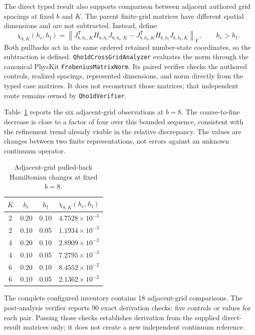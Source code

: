 \documentclass[11pt]{article}
\newcommand{\fro}{\mathrm{F}}
\newcommand{\code}[1]{\texttt{#1}}
\begin{document}
The direct typed result also supports comparison between adjacent authored grid
spacings at fixed $b$ and $K$.  The parent finite-grid matrices have different
spatial dimensions and are not subtracted.  Instead, define
\begin{equation}
  \chi_{b,K}(h_{\mathrm c},h_{\mathrm f})
  =
  \left\|
    J_{b,h_{\mathrm c},K}^{\mathsf T}H_{b,h_{\mathrm c}}
    J_{b,h_{\mathrm c},K}
    -
    J_{b,h_{\mathrm f},K}^{\mathsf T}H_{b,h_{\mathrm f}}
    J_{b,h_{\mathrm f},K}
  \right\|_{\fro},
  \qquad h_{\mathrm c}>h_{\mathrm f}.
  \label{eq:cross-grid}
\end{equation}
Both pullbacks act in the same ordered retained number-state coordinates, so the
subtraction is defined.  \code{Qho1dCrossGridAnalyzer} evaluates the norm through the
canonical PhysKit \code{FrobeniusMatrixNorm}.  Its paired verifier checks the authored
controls, realized spacings, represented dimensions, and norm directly from the typed
case matrices.  It does not reconstruct those matrices; that independent route remains
owned by \code{Qho1dVerifier}.

Table~\ref{tab:cross-grid-b8} reports the six adjacent-grid observations at $b=8$.
The coarse-to-fine decrease is close to a factor of four over this bounded sequence,
consistent with the refinement trend already visible in the relative discrepancy.
The values are changes between two finite representations, not errors against an
unknown continuum operator.

\begin{table}[ht]
\centering
\begin{tabular}{@{}cccc@{}}
\toprule
$K$ & $h_{\mathrm c}$ & $h_{\mathrm f}$ &
$\chi_{8,K}(h_{\mathrm c},h_{\mathrm f})$ \\
\midrule
2 & 0.20 & 0.10 & $4.7528\times10^{-3}$ \\
2 & 0.10 & 0.05 & $1.1934\times10^{-3}$ \\
4 & 0.20 & 0.10 & $2.8909\times10^{-2}$ \\
4 & 0.10 & 0.05 & $7.2795\times10^{-3}$ \\
6 & 0.20 & 0.10 & $8.4552\times10^{-2}$ \\
6 & 0.10 & 0.05 & $2.1362\times10^{-2}$ \\
\bottomrule
\end{tabular}
\caption{Adjacent-grid pulled-back Hamiltonian changes at fixed $b=8$.}
\label{tab:cross-grid-b8}
\end{table}

The complete configured inventory contains 18 adjacent-grid comparisons.  The
post-analysis verifier reports 90 exact derivation checks: five controls or values for
each pair.  Passing those checks establishes derivation from the supplied direct-result
matrices only; it does not create a new independent continuum reference.
\end{document}
